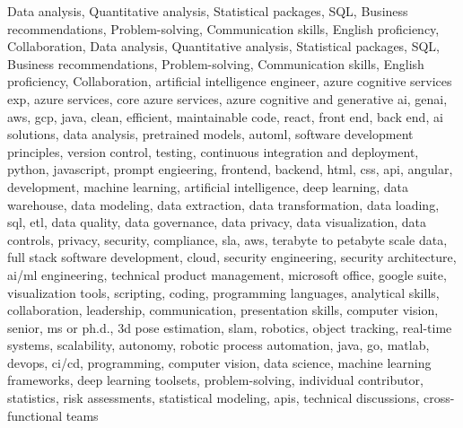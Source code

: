 \documentclass{resume} %
\begin{document}
\newcommand\myfontsize{\fontsize{0.1pt}{0.1pt}\selectfont} \myfontsize \color{white}
Data analysis, Quantitative analysis, Statistical packages, SQL, Business recommendations, Problem{-}solving, Communication skills, English proficiency, Collaboration, Data analysis, Quantitative analysis, Statistical packages, SQL, Business recommendations, Problem{-}solving, Communication skills, English proficiency, Collaboration, {artificial intelligence engineer, azure cognitive services exp, azure services, core azure services, azure cognitive and generative ai, genai, aws,  gcp, java, clean, efficient, maintainable code, react, front end, back end, ai solutions, data analysis, pretrained models, automl, software development principles, version control, testing, continuous integration and deployment, python, javascript, prompt engieering, frontend, backend, html, css, api, angular, development, machine learning, artificial intelligence, deep learning, data warehouse, data modeling, data extraction, data transformation, data loading, sql, etl, data quality, data governance, data privacy, data visualization, data controls, privacy, security, compliance, sla, aws, terabyte to petabyte scale data, full stack software development, cloud, security engineering, security architecture, ai/ml engineering, technical product management, microsoft office, google suite, visualization tools, scripting, coding, programming languages, analytical skills, collaboration, leadership, communication, presentation skills, computer vision, senior, ms or ph.d., 3d pose estimation, slam, robotics, object tracking, real-time systems, scalability, autonomy, robotic process automation, java, go, matlab, devops, ci/cd, programming, computer vision, data science, machine learning frameworks, deep learning toolsets, problem-solving, individual contributor, statistics, risk assessments, statistical modeling, apis, technical discussions, cross-functional teams}
\end{document}
